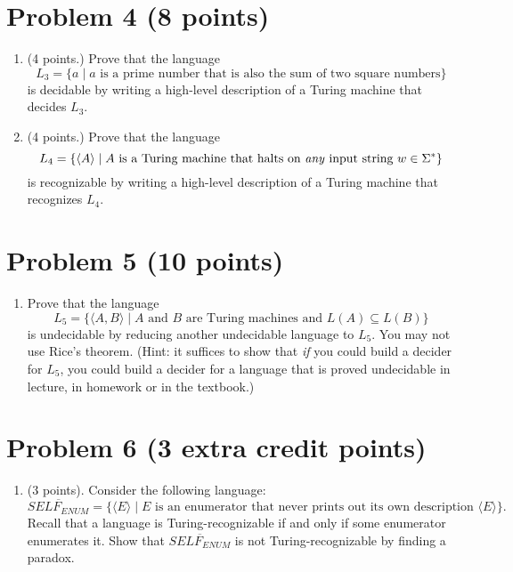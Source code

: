 \documentclass[letterpaper,11pt,twoside]{article}
\theoremstyle{plain}
\theoremstyle{definition}
\theoremstyle{remark}
\theoremstyle{restate}
\begin{document}
\clearpage
\section{Problem 4 (8 points)}
    \begin{enumerate}
        \item (4 points.) Prove that the language
        \[
            L_3 = \{ a \; | \; a \text{ is a prime number that is also the sum of two square numbers} \}
        \]
        is decidable by writing a high-level description of a Turing machine that decides $L_3$.
        
        \item (4 points.) Prove that the language
        \[
            L_4 = \{ \langle A \rangle \; | \; A \text{ is a Turing machine that halts on \emph{any} input string } w \in \Sigma^*\}
        \]
        is recognizable by writing a high-level description of a Turing machine that recognizes $L_4$.
    \end{enumerate}
    
    
\clearpage
\section{Problem 5 (10 points)}
    \begin{enumerate}
        \item Prove that the language
        \[
            L_5 = \{ \langle A, B \rangle \; | \; A \text{ and } B \text{ are Turing machines and } L(A) \subseteq L(B) \}
        \]
        is undecidable by reducing another undecidable language to $L_5$. You may not use Rice's theorem. (Hint: it suffices to show that \emph{if} you could build a decider for $L_5$, you could build a decider for a language that is proved undecidable in lecture, in homework or in the textbook.)
    \end{enumerate}
    
\clearpage
\section{Problem 6 (3 extra credit points)}
    \begin{enumerate}
        \item (3 points). Consider the following language:
        \[
            \overline{SELF_{ENUM}} = \{\langle E \rangle \; | \; E \text{ is an enumerator that never prints out its own description } \langle E \rangle\}.
        \]
        Recall that a language is Turing-recognizable if and only if some enumerator enumerates it. Show that $\overline{SELF_{ENUM}}$ is not Turing-recognizable by finding a paradox.
    \end{enumerate}
\end{document}
